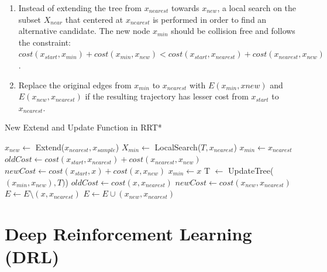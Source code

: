 \documentclass[../thesis.tex]{subfiles}
\begin{document}
\begin{enumerate}

	\item Instead of extending the tree from $x_{nearest}$ towards $x_{new}$, a local search on the subset $X_{near}$ that centered at $x_{nearest}$  is performed in order to find an alternative candidate. The new node $x_{min}$ should be collision free and follows the constraint: $cost(x_{start},x_{min}) + cost(x_{min}, x_{new}) < cost(x_{start},x_{nearest}) + cost(x_{nearest}, x_{new})$. 
	
	\item Replace the original edges from $x_{min}$ to $x_{nearest}$ with $E(x_{min}, x{new})$ and $E(x_{new}, x_{nearest})$ if the resulting trajectory has lesser cost from $x_{start}$ to $x_{nearest}$. 

\end{enumerate}

\begin{algorithm}
  \caption{New Extend and Update Function in RRT*} \label{alg:RRT_star}
  \begin{algorithmic}[1]
    \State $x_{new} \leftarrow $ Extend($x_{nearest}, x_{sample}$)
    \State $X_{min} \leftarrow $ LocalSearch($T, x_{nearest}$)
    \State $x_{min} \leftarrow x_{nearest}$
    	\State $oldCost \leftarrow cost(x_{start},x_{nearest}) + cost(x_{nearest}, x_{new})$
    	\State $newCost \leftarrow cost(x_{start},x) + cost(x, x_{new})$
    	\State $x_{min} \leftarrow x$
    	\EndIf
    \EndFor
    \State T $\leftarrow $ UpdateTree($(x_{min},x_{new}), T)$)
    	\State $oldCost \leftarrow cost(x, x_{nearest})$
    	\State $newCost \leftarrow cost(x_{new}, x_{nearest})$
    		\State $E \leftarrow E \setminus (x, x_{nearest})$
    		\State $E \leftarrow E \cup (x_{new}, x_{nearest})$
    	\EndIf
    \EndFor
  \end{algorithmic}
\end{algorithm}




\section{Deep Reinforcement Learning (DRL)} 
\end{document}

